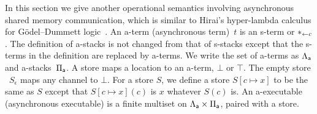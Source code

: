 In this section we give another operational semantics involving
asynchronous shared memory communication, which is similar to Hirai's
hyper-lambda calculus for G\"odel--Dummett logic~\citep{hiraiflops2012}.
An a-term (asynchronous term)~$t$ is an s-term or
$\ast_{\leftarrow{c}}$.
The definition of a-stacks is not changed from that of s-stacks except
that the s-terms in the definition are replaced by a-terms.
We write the set of a-terms as $\Lambda_{\mathsf a}$ and a-stacks~$\Pi_{\mathsf a}$.
A store maps a location to an a-term, $\bot$ or $\top$.
The empty store%
~$S_\epsilon$ maps any channel to $\bot$.
For a store $S$, we define a store $S[c\mapsto x]$ to be
the same as $S$ except that $S[c\mapsto x](c)$ is $x$ whatever $S(c)$ is.
An a-executable (asynchronous executable)
is a finite multiset on $\Lambda_{\mathsf a} \times \Pi_{\mathsf a}$,
paired with a store.

